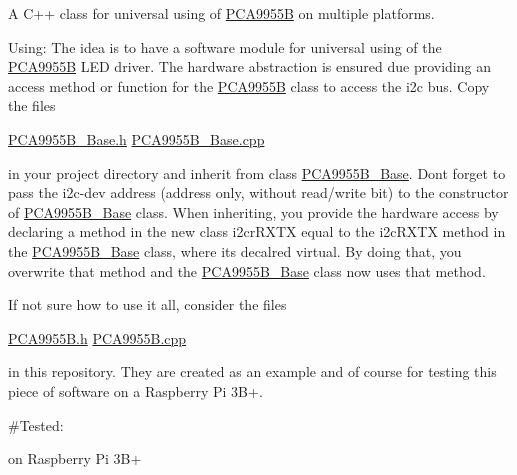 A C++ class for universal using of \mbox{\hyperlink{classPCA9955B}{PCA9955B}} on multiple platforms.

Using\+: The idea is to have a software module for universal using of the \mbox{\hyperlink{classPCA9955B}{PCA9955B}} LED driver. The hardware abstraction is ensured due providing an access method or function for the \mbox{\hyperlink{classPCA9955B}{PCA9955B}} class to access the i2c bus. Copy the files

\mbox{\hyperlink{PCA9955B__Base_8h}{PCA9955\+B\+\_\+\+Base.\+h}} \mbox{\hyperlink{PCA9955B__Base_8cpp}{PCA9955\+B\+\_\+\+Base.\+cpp}}

in your project directory and inherit from class \textquotesingle{}\mbox{\hyperlink{classPCA9955B__Base}{PCA9955\+B\+\_\+\+Base}}\textquotesingle{}. Dont forget to pass the i2c-\/dev address (address only, without read/write bit) to the constructor of \mbox{\hyperlink{classPCA9955B__Base}{PCA9955\+B\+\_\+\+Base}} class. When inheriting, you provide the hardware access by declaring a method in the new class \textquotesingle{}i2cr\+RXTX\textquotesingle{} equal to the \textquotesingle{}i2c\+RXTX\textquotesingle{} method in the \mbox{\hyperlink{classPCA9955B__Base}{PCA9955\+B\+\_\+\+Base}} class, where its decalred \textquotesingle{}virtual\textquotesingle{}. By doing that, you overwrite that method and the \mbox{\hyperlink{classPCA9955B__Base}{PCA9955\+B\+\_\+\+Base}} class now uses that method.

If not sure how to use it all, consider the files

\mbox{\hyperlink{PCA9955B_8h}{PCA9955\+B.\+h}} \mbox{\hyperlink{PCA9955B_8cpp}{PCA9955\+B.\+cpp}}

in this repository. They are created as an example and of course for testing this piece of software on a Raspberry Pi 3B+.

\#\+Tested\+:
\begin{DoxyItemize}
\item on Raspberry Pi 3B+ 
\end{DoxyItemize}